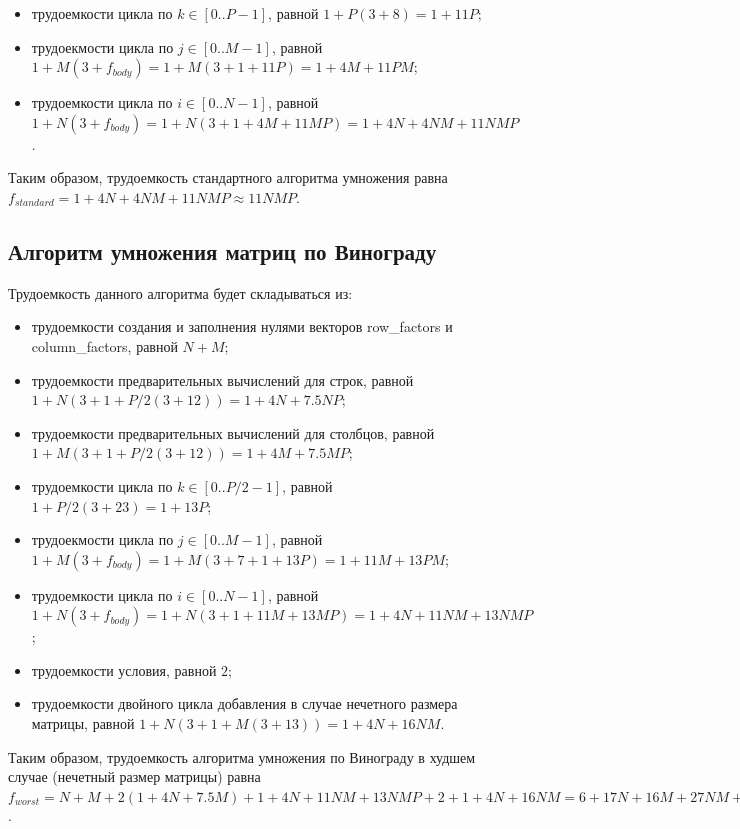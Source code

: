 \begin{itemize}
	\item трудоемкости цикла по $k \in [0..P-1]$, равной $1 + P(3 + 8) = 1 + 11P$;
	\item трудоекмости цикла по $j \in [0..M-1]$, равной $1 + M(3 + f_{body}) = 1 + M(3 + 1 + 11P) = 1 + 4M + 11PM$;
	\item трудоемкости цикла по $i \in [0..N-1]$, равной $1 + N(3 + f_{body}) = 1 + N(3 + 1 + 4M + 11MP) = 1 + 4N + 4NM + 11NMP$.
\end{itemize}

Таким образом, трудоемкость стандартного алгоритма умножения равна $f_{standard} = 1 + 4N + 4NM + 11NMP \approx 11NMP$.

\subsection{Алгоритм умножения матриц по Винограду}

Трудоемкость данного алгоритма будет складываться из:

\begin{itemize}
	\item трудоемкости создания и заполнения нулями векторов row\_factors и column\_factors, равной $N + M$;
	\item трудоемкости предварительных вычислений для строк, равной $1 + N(3 + 1 + P/2(3 + 12)) = 1 + 4N + 7.5NP$;
	\item трудоемкости предварительных вычислений для столбцов, равной $1 + M(3 + 1 + P/2(3 + 12)) = 1 + 4M + 7.5MP$;
	\item трудоемкости цикла по $k \in [0..P/2-1]$, равной $1 + P/2(3 + 23) = 1 + 13P$;
	\item трудоекмости цикла по $j \in [0..M-1]$, равной $1 + M(3 + f_{body}) = 1 + M(3 + 7 + 1 + 13P) = 1 + 11M + 13PM$;
	\item трудоемкости цикла по $i \in [0..N-1]$, равной $1 + N(3 + f_{body}) = 1 + N(3 + 1 + 11M + 13MP) = 1 + 4N + 11NM + 13NMP$;
	\item трудоемкости условия, равной $2$;
	\item трудоемкости двойного цикла добавления в случае нечетного размера матрицы, равной $1 + N(3 + 1 + M(3 + 13)) = 1 + 4N + 16NM$.
\end{itemize}

Таким образом, трудоемкость алгоритма умножения по Винограду в худшем случае (нечетный размер матрицы) равна $f_{worst} = N + M + 2(1 + 4N + 7.5M) + 1 + 4N + 11NM + 13NMP + 2 + 1 + 4N + 16NM = 6 + 17N + 16M + 27NM + 13NMP \approx 13NMP$.

